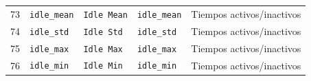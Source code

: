 \begin{landscape}
\begin{longtable}{@{}r p{4.2cm} p{4.4cm} p{4.1cm} p{4.8cm}@{}}
73 & \texttt{idle\_\allowbreak{}mean} & \texttt{Idle Mean} & \texttt{idle\_\allowbreak{}mean} & Tiempos activos/inactivos \\
74 & \texttt{idle\_\allowbreak{}std} & \texttt{Idle Std} & \texttt{idle\_\allowbreak{}std} & Tiempos activos/inactivos \\
75 & \texttt{idle\_\allowbreak{}max} & \texttt{Idle Max} & \texttt{idle\_\allowbreak{}max} & Tiempos activos/inactivos \\
76 & \texttt{idle\_\allowbreak{}min} & \texttt{Idle Min} & \texttt{idle\_\allowbreak{}min} & Tiempos activos/inactivos \\
\end{longtable}
\endgroup
\end{landscape}
